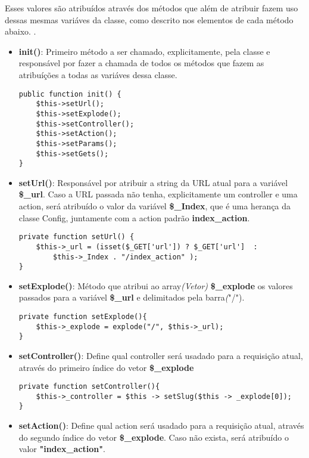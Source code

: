             Esses valores são atribuídos através dos métodos que além de atribuir fazem uso dessas mesmas variáves da classe, como descrito nos elementos de cada método abaixo.
.
            \begin{itemize}

                \item\textbf{init()}: Primeiro método a ser chamado, explicitamente, pela classe e responsável por fazer a chamada de todos os métodos que fazem as atribuíções a todas as variáves dessa classe.
\begin{lstlisting}
public function init() {
    $this->setUrl();
    $this->setExplode();
    $this->setController();
    $this->setAction();
    $this->setParams();
    $this->setGets();
}
\end{lstlisting}

                \item\textbf{setUrl()}: Responsável por atribuir a string da URL atual para a variável \textbf{\$\_url}. Caso a URL passada não tenha, explicitamente um controller e uma action, será atribuído o valor da variável \textbf{\$\_Index}, que é uma herança da classe Config, juntamente com a action padrão \textbf{index\_action}.
\begin{lstlisting}
private function setUrl() {
    $this->_url = (isset($_GET['url']) ? $_GET['url']  :
        $this->_Index . "/index_action" );
}
\end{lstlisting}

                \item\textbf{setExplode()}: Método que atribui ao array\emph{(Vetor)} \textbf{\$\_explode} os valores passados para a variável \textbf{\$\_url} e delimitados pela barra\emph("/").

\begin{lstlisting}
private function setExplode(){
    $this->_explode = explode("/", $this->_url);
}
\end{lstlisting}

                \item\textbf{setController()}: Define qual controller será usadado para a requisição atual, através do primeiro índice do vetor \textbf{\$\_explode}

\begin{lstlisting}
private function setController(){
    $this->_controller = $this -> setSlug($this -> _explode[0]);
}
\end{lstlisting}

                \item\textbf{setAction()}: Define qual action será usadado para a requisição atual, através do segundo índice do vetor \textbf{\$\_explode}. Caso não exista, será atribuído o valor \textbf{"index\_action"}.


\end{itemize}
